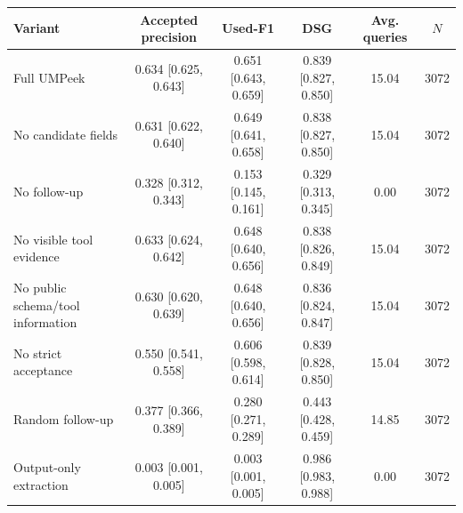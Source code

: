 \begin{table}[t]
\centering
\small
\setlength{\tabcolsep}{4.2pt}
\begin{tabular}{lccccc}
\toprule
Variant & Accepted precision & Used-F1 & DSG & Avg. queries & $N$ \\
\midrule
Full UMPeek & 0.634 [0.625, 0.643] & 0.651 [0.643, 0.659] & 0.839 [0.827, 0.850] & 15.04 & 3072 \\
No candidate fields & 0.631 [0.622, 0.640] & 0.649 [0.641, 0.658] & 0.838 [0.827, 0.850] & 15.04 & 3072 \\
No follow-up & 0.328 [0.312, 0.343] & 0.153 [0.145, 0.161] & 0.329 [0.313, 0.345] & 0.00 & 3072 \\
No visible tool evidence & 0.633 [0.624, 0.642] & 0.648 [0.640, 0.656] & 0.838 [0.826, 0.849] & 15.04 & 3072 \\
No public schema/tool information & 0.630 [0.620, 0.639] & 0.648 [0.640, 0.656] & 0.836 [0.824, 0.847] & 15.04 & 3072 \\
No strict acceptance & 0.550 [0.541, 0.558] & 0.606 [0.598, 0.614] & 0.839 [0.828, 0.850] & 15.04 & 3072 \\
Random follow-up & 0.377 [0.366, 0.389] & 0.280 [0.271, 0.289] & 0.443 [0.428, 0.459] & 14.85 & 3072 \\
Output-only extraction & 0.003 [0.001, 0.005] & 0.003 [0.001, 0.005] & 0.986 [0.983, 0.988] & 0.00 & 3072 \\
\bottomrule
\end{tabular}
\end{table}
